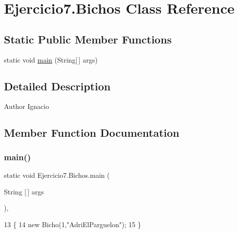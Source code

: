 \hypertarget{class_ejercicio7_1_1_bichos}{}\section{Ejercicio7.\+Bichos Class Reference}
\label{class_ejercicio7_1_1_bichos}
\subsection*{Static Public Member Functions}
\begin{DoxyCompactItemize}
\item 
static void \mbox{\hyperlink{class_ejercicio7_1_1_bichos_a788ffe856b14e20e0021cf8b1b868747}{main}} (String\mbox{[}$\,$\mbox{]} args)
\end{DoxyCompactItemize}


\subsection{Detailed Description}
\begin{DoxyAuthor}{Author}
Ignacio 
\end{DoxyAuthor}


\subsection{Member Function Documentation}
\mbox{\label{class_ejercicio7_1_1_bichos_a788ffe856b14e20e0021cf8b1b868747}} 
\subsubsection{\texorpdfstring{main()}{main()}}
{\footnotesize\ttfamily static void Ejercicio7.\+Bichos.\+main (\begin{DoxyParamCaption}\item[{String \mbox{[}$\,$\mbox{]}}]{args }\end{DoxyParamCaption})\hspace{0.3cm}{\ttfamily [inline]}, {\ttfamily [static]}}


\begin{DoxyCode}
13                                           \{
14         \textcolor{keyword}{new} Bicho(1,\textcolor{stringliteral}{"AdriElParguelon"});
15     \}
\end{DoxyCode}
